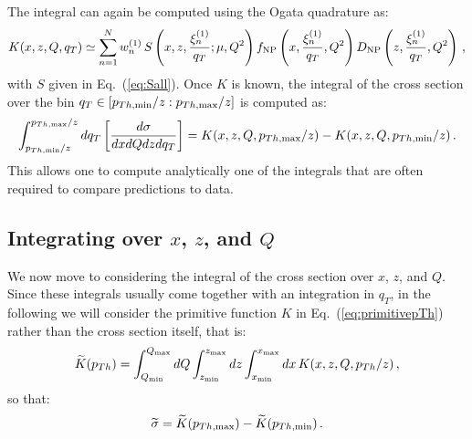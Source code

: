 \documentclass[10pt,a4paper]{article}
\begin{document}
The integral can again be computed using the Ogata quadrature as:
\begin{equation}
\displaystyle   K(x,z,Q,q_{T}) \simeq \displaystyle
  \sum_{n=1}^N w_n^{(1)}
         \,S\left(x,z,\frac{\xi_n^{(1)}}{q_{T}};\mu,Q^2\right) f_{\rm
           NP}\left(x, \frac{\xi_n^{(1)}}{q_{T}},Q^2\right) D_{\rm
           NP}\left(z, \frac{\xi_n^{(1)}}{q_{T}},Q^2\right)\,,
\label{eq:primitivepTh}
\end{equation}
with $S$ given in Eq.~(\ref{eq:Sall}). Once $K$ is known, the integral
of the cross section over the bin
$q_{T}\in [p_{Th,\rm min}/z: p_{Th,\rm max}/z]$ is computed as:
\begin{equation}
  \int_{p_{Th,\rm min}/z}^{p_{Th,\rm max}/z} dq_{T}\left[\frac{d\sigma}{dxdQdz d
      q_{T}}\right]=K(x,z,Q, p_{Th,\rm max}/z)-K(x,z,Q, p_{Th,\rm min}/z)\,.
\end{equation}
This allows one to compute analytically one of the integrals that are
often required to compare predictions to data. 

\subsection{Integrating over $x$, $z$, and $Q$}

We now move to considering the integral of the cross section over $x$,
$z$, and $Q$. Since these integrals usually come together with an
integration in $q_{T}$, in the following we will consider the
primitive function $K$ in Eq.~(\ref{eq:primitivepTh}) rather than the
cross section itself, that is:
\begin{equation}
  \widetilde{K}(p_{Th})=\int_{Q_{\rm min}}^{Q_{\rm max}}dQ \int_{z_{\rm
      min}}^{z_{\rm max}}dz \int_{x_{\rm min}}^{x_{\rm max}}dx\,
  K(x,z,Q,p_{Th}/z)\,,
\label{eq:IntcrosssectionSIDISPrim}
\end{equation}
so that:
\begin{equation}
  \widetilde{\sigma}=\widetilde{K}(p_{Th,\rm max})-\widetilde{K}(p_{Th,\rm min})\,.
\end{equation}
\end{document}
